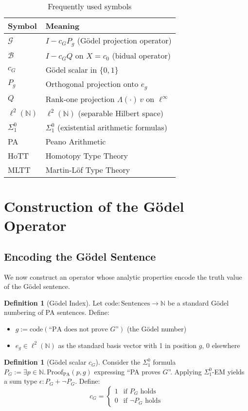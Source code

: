 \documentclass[11pt]{article}
\theoremstyle{definition}
\newtheorem{definition}[theorem]{Definition}
\newcommand{\N}{\mathbb{N}}
\newcommand{\lp}{\ell^{2}(\N)}
\newcommand{\SigOne}{\Sigma^{0}_{\!1}}
\begin{document}
\begin{table}[h]\centering\small
\caption{Frequently used symbols}\label{tab:symbols}
\begin{tabular}{ll}
\toprule
Symbol & Meaning \\
\midrule
$\mathcal G$ & $I-c_G P_g$ (Gödel projection operator)\\
$\mathcal B$ & $I-c_G Q$ on $X=c_0$ (bidual operator)\\
$c_G$ & Gödel scalar in $\{0,1\}$\\
$P_g$ & Orthogonal projection onto $e_g$\\
$Q$ & Rank-one projection $\Lambda(\cdot)\,v$ on $\ell^\infty$\\
$\lp$ & $\ell^{2}(\N)$ (separable Hilbert space)\\
$\SigOne$ & $\Sigma^{0}_{1}$ (existential arithmetic formulas)\\
PA & Peano Arithmetic\\
HoTT & Homotopy Type Theory\\
MLTT & Martin-Löf Type Theory\\
\bottomrule
\end{tabular}
\end{table}

\section{Construction of the Gödel Operator}

\subsection{Encoding the Gödel Sentence}

We now construct an operator whose analytic properties encode the truth value of the Gödel sentence.

\begin{definition}[Gödel Index]
Let $\mathrm{code}: \text{Sentences} \to \N$ be a standard Gödel numbering of PA sentences. Define:
\begin{itemize}
\item $g := \mathrm{code}(\text{``PA does not prove $G$''})$ (the Gödel number)
\item $e_g \in \lp$ as the standard basis vector with 1 in position $g$, 0 elsewhere
\end{itemize}
\end{definition}

\begin{definition}[Gödel scalar $c_G$]\label{def:cg}
Consider the $\SigOne$ formula $P_G := \exists p \in \N.\, \mathrm{Proof}_{\mathrm{PA}}(p,g)$ expressing ``PA proves $G$''. Applying $\SigOne$-EM yields a sum type $\epsilon: P_G + \neg P_G$. Define:
\[
c_G = \begin{cases}
1 & \text{if } P_G \text{ holds} \\
0 & \text{if } \neg P_G \text{ holds}
\end{cases}
\]
\end{definition}
\end{document}
